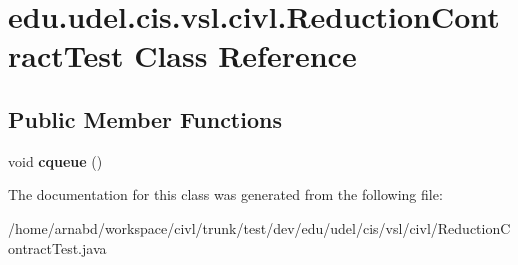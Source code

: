 \hypertarget{classedu_1_1udel_1_1cis_1_1vsl_1_1civl_1_1ReductionContractTest}{}\section{edu.\+udel.\+cis.\+vsl.\+civl.\+Reduction\+Contract\+Test Class Reference}
\label{classedu_1_1udel_1_1cis_1_1vsl_1_1civl_1_1ReductionContractTest}
\subsection*{Public Member Functions}
\begin{DoxyCompactItemize}
\item 
\hypertarget{classedu_1_1udel_1_1cis_1_1vsl_1_1civl_1_1ReductionContractTest_ab4f67488f2e65608b2aa8f4cdb04005c}{}void {\bfseries cqueue} ()\label{classedu_1_1udel_1_1cis_1_1vsl_1_1civl_1_1ReductionContractTest_ab4f67488f2e65608b2aa8f4cdb04005c}

\end{DoxyCompactItemize}


The documentation for this class was generated from the following file\+:\begin{DoxyCompactItemize}
\item 
/home/arnabd/workspace/civl/trunk/test/dev/edu/udel/cis/vsl/civl/Reduction\+Contract\+Test.\+java\end{DoxyCompactItemize}
